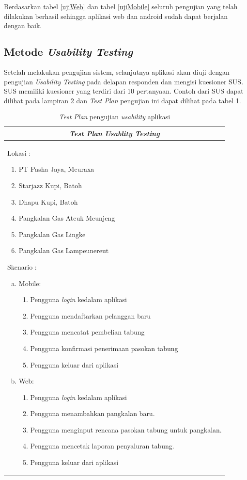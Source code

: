 	Berdasarkan tabel \ref{ujiWeb} dan tabel \ref{ujiMobile} seluruh pengujian yang telah dilakukan berhasil sehingga aplikasi web dan android sudah dapat berjalan dengan baik. 
	
	\subsection{Metode \textit{Usability Testing}}
	
	Setelah melakukan pengujian sistem, selanjutnya aplikasi akan diuji dengan pengujian \textit{Usability Testing} pada delapan responden dan mengisi kuesioner SUS. SUS memiliki kuesioner yang terdiri dari 10 pertanyaan. Contoh dari SUS dapat dilihat pada lampiran 2 dan \textit{Test Plan} pengujian ini dapat dilihat pada tabel \ref{test plan}.
	
		\begin{center}
		\begin{table}[H]
			\center
			\caption{\textit{Test Plan }pengujian \textit{usability} aplikasi}
			\label{test plan}
			\begin{tabular}{ |p{12cm}|  }
				\hline
				\multicolumn{1}{|c|}{\textbf{\textit{Test Plan} \textit{Usablity Testing}}} \\
				\hline
				Lokasi :
				\begin{enumerate}
					\item PT Pasha Jaya, Meuraxa
					\item Starjazz Kupi, Batoh
					\item Dhapu Kupi, Batoh
					\item Pangkalan Gas Ateuk Meunjeng
					\item Pangkalan Gas Lingke
					\item Pangkalan Gas Lampeunereut
				\end{enumerate}
				Skenario :
				\begin{enumerate}[a.]
					\item Mobile:
						\begin{enumerate}[1.]
							\item Pengguna \textit{login} kedalam aplikasi
							\item Pengguna mendaftarkan pelanggan baru
							\item Pengguna mencatat pembelian tabung 
							\item Pengguna konfirmasi penerimaan pasokan tabung
							\item Pengguna keluar dari aplikasi
							
						\end{enumerate}
					\item Web:
						\begin{enumerate}[1.]
							\item Pengguna \textit{login} kedalam aplikasi
							\item Pengguna menambahkan pangkalan baru.
							\item Pengguna menginput rencana pasokan tabung untuk pangkalan.
							\item Pengguna mencetak laporan penyaluran tabung.
							\item Pengguna keluar dari aplikasi
							

\end{enumerate}
\end{enumerate}
\end{tabular}
\end{table}
\end{center}
